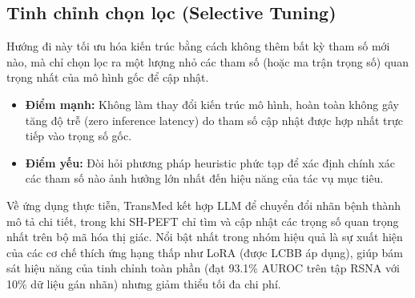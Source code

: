 \subsection{Tinh chỉnh chọn lọc (Selective Tuning)}
Hướng đi này tối ưu hóa kiến trúc bằng cách không thêm bất kỳ tham số mới nào, mà chỉ chọn lọc ra một lượng nhỏ các tham số (hoặc ma trận trọng số) quan trọng nhất của mô hình gốc để cập nhật.
\begin{itemize}
    \item \textbf{Điểm mạnh:} Không làm thay đổi kiến trúc mô hình, hoàn toàn không gây tăng độ trễ (zero inference latency) do tham số cập nhật được hợp nhất trực tiếp vào trọng số gốc.
    \item \textbf{Điểm yếu:} Đòi hỏi phương pháp heuristic phức tạp để xác định chính xác các tham số nào ảnh hưởng lớn nhất đến hiệu năng của tác vụ mục tiêu.
\end{itemize}
Về ứng dụng thực tiễn, TransMed \cite{TransMed} kết hợp LLM để chuyển đổi nhãn bệnh thành mô tả chi tiết, trong khi SH-PEFT \cite{SH-PEFT} chỉ tìm và cập nhật các trọng số quan trọng nhất trên bộ mã hóa thị giác. Nổi bật nhất trong nhóm hiệu quả là sự xuất hiện của các cơ chế thích ứng hạng thấp như LoRA (được LCBB \cite{LCBB} áp dụng), giúp bám sát hiệu năng của tinh chỉnh toàn phần (đạt 93.1\% AUROC trên tập RSNA với 10\% dữ liệu gán nhãn) nhưng giảm thiểu tối đa chi phí.

